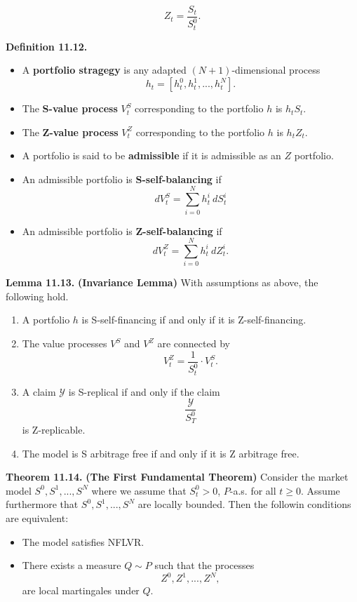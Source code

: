 \documentclass[
]{article}
\providecommand{\tightlist}{%
  \setlength{\itemsep}{0pt}\setlength{\parskip}{0pt}}
\begin{document}
\[
Z_t=\frac{S_t}{S_t^0}.
\]

\textbf{Definition 11.12.}

\begin{itemize}
\tightlist
\item
  A \textbf{portfolio stragegy} is any adapted \((N+1)\)-dimensional
  process \[
    h_t=[h_t^0,h_t^1,...,h_t^N].
    \]
\item
  The \textbf{S-value process} \(V_t^S\) corresponding to the portfolio
  \(h\) is \(h_tS_t\).
\item
  The \textbf{Z-value process} \(V_t^Z\) corresponding to the portfolio
  \(h\) is \(h_tZ_t\).
\item
  A portfolio is said to be \textbf{admissible} if it is admissible as
  an \(Z\) portfolio.
\item
  An admissible portfolio is \textbf{S-self-balancing} if \[
    dV_t^S=\sum_{i=0}^Nh_t^i\ dS_t^i
    \]
\item
  An admissible portfolio is \textbf{Z-self-balancing} if \[
    dV_t^Z=\sum_{i=0}^Nh_t^i\ dZ_t^i.
    \]
\end{itemize}

\textbf{Lemma 11.13.} \textbf{(Invariance Lemma)} With assumptions as
above, the following hold.

\begin{enumerate}
\def\labelenumi{\roman{enumi}.}
\tightlist
\item
  A portfolio \(h\) is S-self-financing if and only if it is
  Z-self-financing.
\item
  The value processes \(V^S\) and \(V^Z\) are connected by \[
    V_t^Z=\frac{1}{S_t^0}\cdot V_t^S.
    \]
\item
  A claim \(\mathcal{Y}\) is S-replical if and only if the claim \[
    \frac{\mathcal{Y}}{S_T^0}
    \] is Z-replicable.
\item
  The model is S arbitrage free if and only if it is Z arbitrage free.
\end{enumerate}

\textbf{Theorem 11.14.} \textbf{(The First Fundamental Theorem)}
Consider the market model \(S^0,S^1,...,S^N\) where we assume that
\(S^0_t>0\), \(P\)-a.s. for all \(t\ge 0\). Assume furthermore that
\(S^0,S^1,...,S^N\) are locally bounded. Then the followin conditions
are equivalent:

\begin{itemize}
\tightlist
\item
  The model satisfies NFLVR.
\item
  There exists a measure \(Q\sim P\) such that the processes \[
    Z^0,Z^1,...,Z^N,
    \] are local martingales under \(Q\).
\end{itemize}
\end{document}
